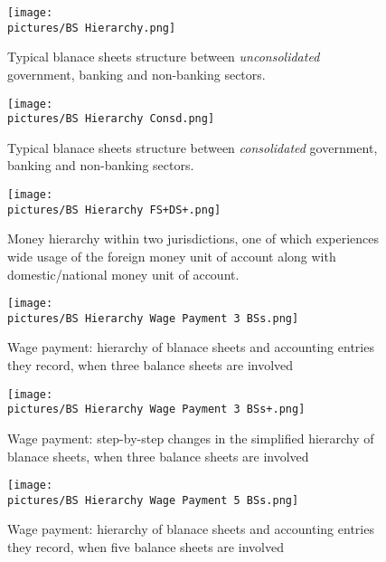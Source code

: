 { %

\begin{landscape}

\begin{figure}
\centering
\texttt{[image: \\pictures/BS Hierarchy.png]}
\caption{Typical blanace sheets structure between \textit{unconsolidated} government, banking and non-banking sectors.}
\label{fig:bs_hierarchy}
\end{figure}

\newpage

\begin{figure}
\centering
\texttt{[image: \\pictures/BS Hierarchy Consd.png]}
\caption{Typical blanace sheets structure between \textit{consolidated} government, banking and non-banking sectors.}
\label{fig:bs_hierarchy_consd}
\end{figure}

\end{landscape}

\newpage

\begin{figure}
\centering
\texttt{[image: \\pictures/BS Hierarchy FS+DS+.png]}
\caption{Money hierarchy within two jurisdictions, one of which experiences wide usage of the foreign money unit of account along with domestic/national money unit of account.}
\label{fig:bs_hierarchy_fs_sd}
\end{figure}

\newpage

\begin{figure}
\centering
\texttt{[image: \\pictures/BS Hierarchy Wage Payment 3 BSs.png]}
\caption{Wage payment: hierarchy of blanace sheets and accounting entries they record, when three balance sheets are involved}
\label{fig:bs_hierarchy_wage_payment_3BS}
\end{figure}

\newpage

\begin{figure}
\centering
\texttt{[image: \\pictures/BS Hierarchy Wage Payment 3 BSs+.png]}
\caption{Wage payment: step-by-step changes in the simplified hierarchy of blanace sheets, when three balance sheets are involved}
\label{fig:bs_hierarchy_wage_payment_3BS_}
\end{figure}

\newpage

\begin{figure}
\centering
\texttt{[image: \\pictures/BS Hierarchy Wage Payment 5 BSs.png]}
\caption{Wage payment: hierarchy of blanace sheets and accounting entries they record, when five balance sheets are involved}
\label{fig:bs_hierarchy_wage_payment_5BS}
\end{figure}

}

